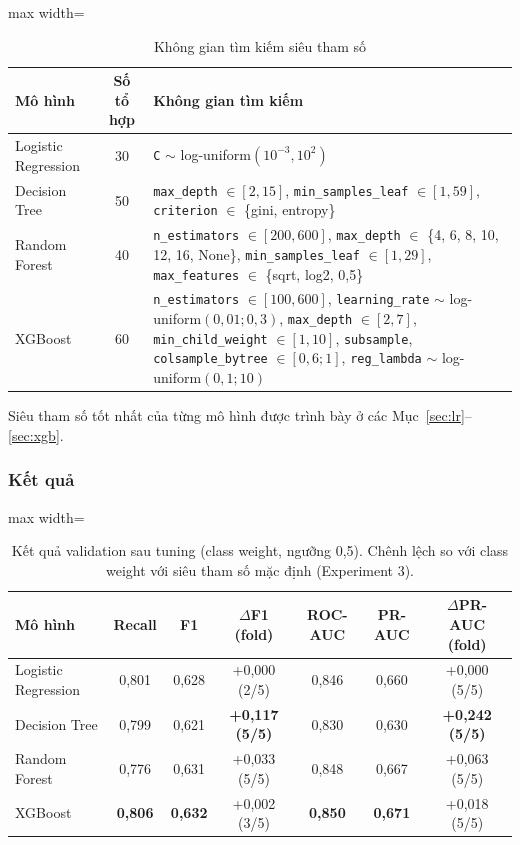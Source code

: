 \begin{table}[H]
\centering
\small
\begin{adjustbox}{max width=\textwidth}
\begin{tabular}{|l|c|p{9.8cm}|}
\hline
\textbf{Mô hình} & \textbf{Số tổ hợp} & \textbf{Không gian tìm kiếm} \\
\hline
Logistic Regression & 30 & \texttt{C} $\sim$ log-uniform$(10^{-3}, 10^{2})$ \\
\hline
Decision Tree & 50 & \texttt{max\_depth} $\in [2, 15]$, \texttt{min\_samples\_leaf} $\in [1, 59]$, \texttt{criterion} $\in$ \{gini, entropy\} \\
\hline
Random Forest & 40 & \texttt{n\_estimators} $\in [200, 600]$, \texttt{max\_depth} $\in$ \{4, 6, 8, 10, 12, 16, None\}, \texttt{min\_samples\_leaf} $\in [1, 29]$, \texttt{max\_features} $\in$ \{sqrt, log2, 0,5\} \\
\hline
XGBoost & 60 & \texttt{n\_estimators} $\in [100, 600]$, \texttt{learning\_rate} $\sim$ log-uniform$(0{,}01; 0{,}3)$, \texttt{max\_depth} $\in [2, 7]$, \texttt{min\_child\_weight} $\in [1, 10]$, \texttt{subsample}, \texttt{colsample\_bytree} $\in [0{,}6; 1]$, \texttt{reg\_lambda} $\sim$ log-uniform$(0{,}1; 10)$ \\
\hline
\end{tabular}
\end{adjustbox}
\caption{Không gian tìm kiếm siêu tham số}
\end{table}

Siêu tham số tốt nhất của từng mô hình được trình bày ở các Mục~\ref{sec:lr}--\ref{sec:xgb}.

\subsubsection{Kết quả}

\begin{table}[H]
\centering
\small
\begin{adjustbox}{max width=\textwidth}
\begin{tabular}{|l|c|c|c|c|c|c|}
\hline
\textbf{Mô hình} & \textbf{Recall} & \textbf{F1} & \textbf{$\Delta$F1 (fold)} & \textbf{ROC-AUC} & \textbf{PR-AUC} & \textbf{$\Delta$PR-AUC (fold)} \\
\hline
Logistic Regression & 0,801 & 0,628 & +0,000 (2/5) & 0,846 & 0,660 & +0,000 (5/5) \\
\hline
Decision Tree & 0,799 & 0,621 & \textbf{+0,117 (5/5)} & 0,830 & 0,630 & \textbf{+0,242 (5/5)} \\
\hline
Random Forest & 0,776 & 0,631 & +0,033 (5/5) & 0,848 & 0,667 & +0,063 (5/5) \\
\hline
XGBoost & \textbf{0,806} & \textbf{0,632} & +0,002 (3/5) & \textbf{0,850} & \textbf{0,671} & +0,018 (5/5) \\
\hline
\end{tabular}
\end{adjustbox}
\caption{Kết quả validation sau tuning (class weight, ngưỡng 0,5). Chênh lệch so với class weight với siêu tham số mặc định (Experiment 3).}
\label{tab:tuning}
\end{table}

